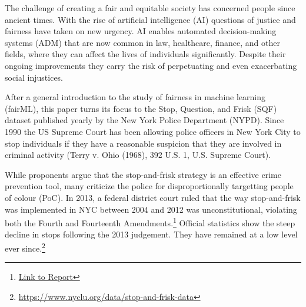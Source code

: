 
The challenge of creating a fair and equitable society has concerned people since ancient times. With the rise of artificial intelligence (AI) questions of justice and fairness have taken on new urgency. AI enables automated decision-making systems (ADM) that are now common in law, healthcare, finance, and other fields, where they can affect the lives of individuals significantly. Despite their ongoing improvements they carry the risk of perpetuating and even exacerbating social injustices.\par

After a general introduction to the study of fairness in machine learning (fairML), this paper turns its focus to the Stop, Question, and Frisk (SQF) dataset published yearly by the New York Police Department (NYPD). Since 1990 the US Supreme Court has been allowing police officers in New York City to stop individuals if they have a reasonable suspicion that they are involved in criminal activity (Terry v. Ohio (1968), 392 U.S. 1, U.S. Supreme Court).\par
While proponents argue that the stop-and-frisk strategy is an effective crime prevention tool, many criticize the police for disproportionally targetting people of colour (PoC).
In 2013, a federal district court ruled that the way stop-and-frisk was implemented in NYC between 2004 and 2012 was unconstitutional, violating both the Fourth and Fourteenth Amendments.\footnote{\href{https://www.policinginstitute.org/wp-content/uploads/2018/07/5-THINGS-Stop\_Question\_Frisk.pdf}{Link to Report}}
Official statistics show the steep decline in stops following the 2013 judgement. They have remained at a low level ever since.\footnote{\href{https://www.nyclu.org/data/stop-and-frisk-data}{https://www.nyclu.org/data/stop-and-frisk-data}}




